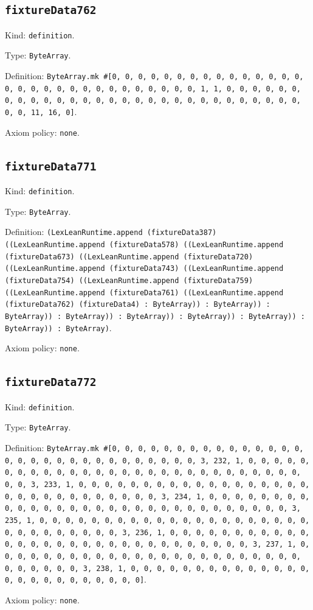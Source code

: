 \documentclass[11pt]{article}
\begin{document}
\subsection*{\texttt{fixtureData762}}
\noindent Kind: \texttt{definition}.\par
\noindent Type: \texttt{ByteArray}.\par
\noindent Definition: \texttt{ByteArray.mk \#[0, 0, 0, 0, 0, 0, 0, 0, 0, 0, 0, 0, 0, 0, 0, 0, 0, 0, 0, 0, 0, 0, 0, 0, 0, 0, 0, 0, 0, 0, 1, 1, 0, 0, 0, 0, 0, 0, 0, 0, 0, 0, 0, 0, 0, 0, 0, 0, 0, 0, 0, 0, 0, 0, 0, 0, 0, 0, 0, 0, 0, 0, 0, 11, 16, 0]}.\par
\noindent Axiom policy: \texttt{none}.\par
\subsection*{\texttt{fixtureData771}}
\noindent Kind: \texttt{definition}.\par
\noindent Type: \texttt{ByteArray}.\par
\noindent Definition: \texttt{(LexLeanRuntime.append (fixtureData387) ((LexLeanRuntime.append (fixtureData578) ((LexLeanRuntime.append (fixtureData673) ((LexLeanRuntime.append (fixtureData720) ((LexLeanRuntime.append (fixtureData743) ((LexLeanRuntime.append (fixtureData754) ((LexLeanRuntime.append (fixtureData759) ((LexLeanRuntime.append (fixtureData761) ((LexLeanRuntime.append (fixtureData762) (fixtureData4) : ByteArray)) : ByteArray)) : ByteArray)) : ByteArray)) : ByteArray)) : ByteArray)) : ByteArray)) : ByteArray)) : ByteArray)}.\par
\noindent Axiom policy: \texttt{none}.\par
\subsection*{\texttt{fixtureData772}}
\noindent Kind: \texttt{definition}.\par
\noindent Type: \texttt{ByteArray}.\par
\noindent Definition: \texttt{ByteArray.mk \#[0, 0, 0, 0, 0, 0, 0, 0, 0, 0, 0, 0, 0, 0, 0, 0, 0, 0, 0, 0, 0, 0, 0, 0, 0, 0, 0, 0, 0, 0, 3, 232, 1, 0, 0, 0, 0, 0, 0, 0, 0, 0, 0, 0, 0, 0, 0, 0, 0, 0, 0, 0, 0, 0, 0, 0, 0, 0, 0, 0, 0, 0, 0, 3, 233, 1, 0, 0, 0, 0, 0, 0, 0, 0, 0, 0, 0, 0, 0, 0, 0, 0, 0, 0, 0, 0, 0, 0, 0, 0, 0, 0, 0, 0, 0, 0, 3, 234, 1, 0, 0, 0, 0, 0, 0, 0, 0, 0, 0, 0, 0, 0, 0, 0, 0, 0, 0, 0, 0, 0, 0, 0, 0, 0, 0, 0, 0, 0, 0, 3, 235, 1, 0, 0, 0, 0, 0, 0, 0, 0, 0, 0, 0, 0, 0, 0, 0, 0, 0, 0, 0, 0, 0, 0, 0, 0, 0, 0, 0, 0, 0, 0, 3, 236, 1, 0, 0, 0, 0, 0, 0, 0, 0, 0, 0, 0, 0, 0, 0, 0, 0, 0, 0, 0, 0, 0, 0, 0, 0, 0, 0, 0, 0, 0, 0, 3, 237, 1, 0, 0, 0, 0, 0, 0, 0, 0, 0, 0, 0, 0, 0, 0, 0, 0, 0, 0, 0, 0, 0, 0, 0, 0, 0, 0, 0, 0, 0, 0, 3, 238, 1, 0, 0, 0, 0, 0, 0, 0, 0, 0, 0, 0, 0, 0, 0, 0, 0, 0, 0, 0, 0, 0, 0, 0, 0, 0]}.\par
\noindent Axiom policy: \texttt{none}.\par
\end{document}
